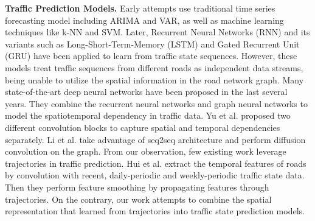 \vspace{\baselineskip}

\textbf{Traffic Prediction Models.} Early attempts use traditional time series forecasting model including ARIMA\cite{ARIMA_pred} and VAR\cite{var_pred}, as well as machine learning techniques like k-NN\cite{knn_pred} and SVM\cite{svm_pred}. Later, Recurrent Neural Networks (RNN)\cite{LSTM} and its variants such as  Long-Short-Term-Memory (LSTM)\cite{LSTM} and Gated Recurrent Unit (GRU)\cite{GRU} have been applied to learn from traffic state sequences. However, these models treat traffic sequences from different roads as independent data streams, being unable to utilize the spatial information in the road network graph. Many state-of-the-art deep neural networks have been proposed in the last several years. They combine the recurrent neural networks and graph neural networks to model the spatiotemporal dependency in traffic data. Yu et al.\cite{STGCN} proposed two different convolution blocks to capture spatial and temporal dependencies separately. Li et al.\cite{DCRNN} take advantage of seq2seq\cite{seq2seq} architecture and perform diffusion convolution on the graph. From our observation, few existing work leverage trajectories in traffic prediction. Hui et al.\cite{trajnet} extract the temporal features of roads by convolution with recent, daily-periodic and weekly-periodic traffic state data. Then they perform feature smoothing by propagating features through trajectories. On the contrary, our work attempts to combine the spatial representation that learned from trajectories into traffic state prediction models.
